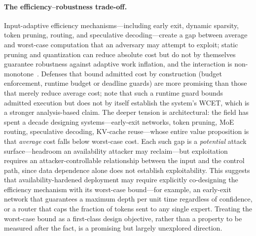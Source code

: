 \documentclass[acmsmall,screen,review,nonacm]{acmart}
\begin{document}
\paragraph{The efficiency--robustness trade-off.} Input-adaptive efficiency mechanisms---including early exit, dynamic sparsity, token pruning, routing, and speculative decoding---create a gap between average and worst-case computation that an adversary may attempt to exploit; static pruning and quantization can reduce absolute cost but do not by themselves guarantee robustness against adaptive work inflation, and the interaction is non-monotone~\cite{hasan2025sensing,telintelo2024skipsponge}. Defenses that bound admitted cost by construction (budget enforcement, runtime budget or deadline guards) are more promising than those that merely reduce average cost; note that such a runtime guard bounds admitted execution but does not by itself establish the system's WCET, which is a stronger analysis-based claim. The deeper tension is architectural: the field has spent a decade designing systems---early-exit networks, token pruning, MoE routing, speculative decoding, KV-cache reuse---whose entire value proposition is that \emph{average} cost falls below worst-case cost. Each such gap is a \emph{potential} attack surface---headroom an availability attacker may reclaim---but exploitation requires an attacker-controllable relationship between the input and the control path, since data dependence alone does not establish exploitability. This suggests that availability-hardened deployment may require explicitly co-designing the efficiency mechanism with its worst-case bound---for example, an early-exit network that guarantees a maximum depth per unit time regardless of confidence, or a router that caps the fraction of tokens sent to any single expert. Treating the worst-case bound as a first-class design objective, rather than a property to be measured after the fact, is a promising but largely unexplored direction.
\end{document}
